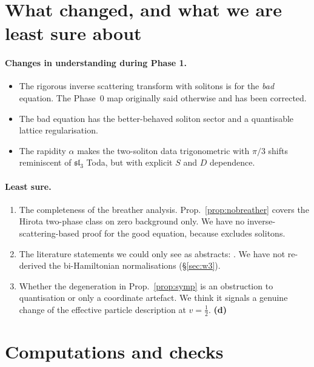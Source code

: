 \documentclass[11pt,a4paper]{article}
\newcommand{\Ld}{\textsf{\textbf{(d)}}}
\theoremstyle{remark}
\begin{document}
\section{What changed, and what we are least sure about}

\paragraph{Changes in understanding during Phase 1.}
\begin{itemize}
\item The rigorous inverse scattering transform with solitons \cite{CL-SOL,CL-SR} is for the \emph{bad} equation. The Phase~0 map originally said otherwise and has been corrected.
\item The bad equation has the better-behaved soliton sector and a quantisable lattice regularisation.
\item The rapidity $\alpha$ makes the two-soliton data trigonometric with $\pi/3$ shifts reminiscent of $\mathfrak{sl}_3$ Toda, but with explicit $S$ and $D$ dependence.
\end{itemize}

\paragraph{Least sure.}
\begin{enumerate}
\item The completeness of the breather analysis. Prop.~\ref{prop:nobreather} covers the Hirota two-phase class on zero background only. We have no inverse-scattering-based proof for the good equation, because \cite{CL-GB} excludes solitons.
\item The literature statements we could only see as abstracts: \cite{Zak,DTT,LMK,HI,KM,BonaSachs,Sutherland,Gutzwiller,Mertens}. We have not re-derived the bi-Hamiltonian normalisations (\S\ref{sec:w3}).
\item Whether the degeneration in Prop.~\ref{prop:symp} is an obstruction to quantisation or only a coordinate artefact. We think it signals a genuine change of the effective particle description at $v=\frac12$. \Ld
\end{enumerate}

\appendix
\section{Computations and checks}\label{app:checks}
\end{document}
